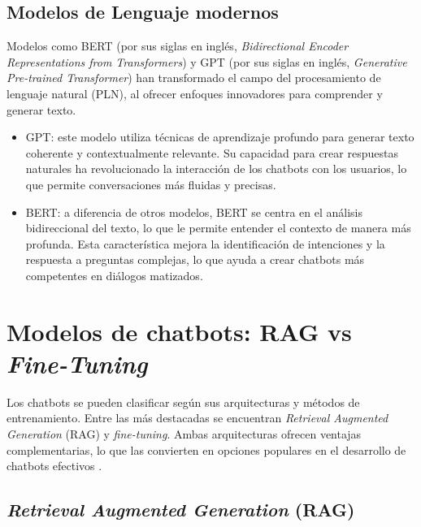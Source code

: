   \newpage
  \subsection{Modelos de Lenguaje modernos}

  Modelos como BERT (por sus siglas en inglés, \textit{Bidirectional Encoder Representations from Transformers}) y GPT (por sus siglas en inglés, \textit{Generative Pre-trained Transformer}) han transformado el campo del procesamiento de lenguaje natural (PLN), al ofrecer enfoques innovadores para comprender y generar texto.
  
  \begin{itemize}
	  \item GPT: este modelo utiliza técnicas de aprendizaje profundo para generar texto coherente y contextualmente relevante. Su capacidad para crear respuestas naturales ha revolucionado la interacción de los chatbots con los usuarios, lo que permite conversaciones más fluidas y precisas.
  
	  \item BERT: a diferencia de otros modelos, BERT se centra en el análisis bidireccional del texto, lo que le permite entender el contexto de manera más profunda. Esta característica mejora la identificación de intenciones y la respuesta a preguntas complejas, lo que ayuda a crear chatbots más competentes en diálogos matizados.
  \end{itemize}
  

  \section{Modelos de chatbots: RAG vs \textit{Fine-Tuning}}
  
  Los chatbots se pueden clasificar según sus arquitecturas y métodos de entrenamiento. Entre las más destacadas se encuentran \textit{Retrieval Augmented Generation} (RAG) y \textit{fine-tuning}. Ambas arquitecturas ofrecen ventajas complementarias, lo que las convierten en opciones populares en el desarrollo de chatbots efectivos \cite{greyling2023}.




\subsection{\textit{Retrieval Augmented Generation} (RAG)}

